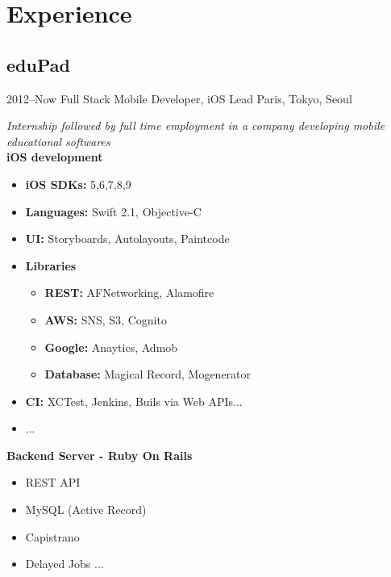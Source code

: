 \documentclass[]{template/friggeri-cv} %
\begin{document}

\section{Experience}

\subsection{eduPad}
\begin{entrylist}


\entry
{2012--Now}
{Full Stack Mobile Developer, iOS Lead}
{Paris, Tokyo, Seoul}
{\emph{Internship followed by full time employment in a company developing mobile educational softwares}\\
\textbf{iOS development} 
\begin{itemize}
\item \textbf{iOS SDKs:} 5,6,7,8,9
\item \textbf{Languages:} Swift 2.1, Objective-C
\item \textbf{UI:} Storyboards, Autolayouts, Paintcode
\item \textbf{Libraries}
\begin{itemize}
\item \textbf{REST:} AFNetworking, Alamofire
\item \textbf{AWS:} SNS, S3, Cognito
\item \textbf{Google:} Anaytics, Admob
\item \textbf{Database:} Magical Record, Mogenerator
\end{itemize}
\item \textbf{CI:} XCTest, Jenkins, Buils via Web APIs...
\item ...
\end{itemize}
\textbf{Backend Server - Ruby On Rails} 
\begin{itemize}
\item REST API
\item MySQL (Active Record)
\item Capistrano
\item Delayed Jobs ...
\end{itemize}


}
\end{entrylist}
\end{document}
